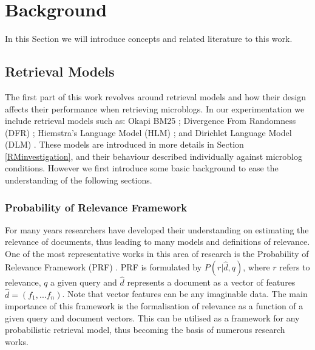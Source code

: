 \section{Background}
\label{background}
In this Section we will introduce concepts and related literature to this work.

\subsection{Retrieval Models}
The first part of this work revolves around retrieval models and how their design affects their performance when retrieving microblogs. In our experimentation we include retrieval models such as: Okapi BM25 \cite{robertson2009probabilistic}; Divergence From Randomness (DFR) \cite{amati2003probabilistic}; Hiemstra's Language Model (HLM) \cite{model}; and Dirichlet Language Model (DLM) \cite{zhai2001study}. These models are introduced in more details in Section \ref{RMinvestigation}, and their behaviour described individually against microblog conditions. However we first introduce some basic background to ease the understanding of the following sections.

\subsubsection{Probability of Relevance Framework} For many years researchers have developed their understanding on estimating the relevance of documents, thus leading to many models and definitions of relevance. One of the most representative works in this area of research is the Probability of Relevance Framework (PRF) \cite{roelleke2013information}. PRF is formulated by \(P(r|\hat{d},q)\), where \(r\) refers to relevance, \(q\) a given query and \(\hat{d}\) represents a document as a vector of features \(\hat{d} = (f_1,...f_n)\). Note that vector features can be any imaginable data. The main importance of this framework is the formalisation of relevance as a function of a given query and document vectors. This can be utilised as a framework for any probabilistic retrieval model, thus becoming the basis of numerous research works.

